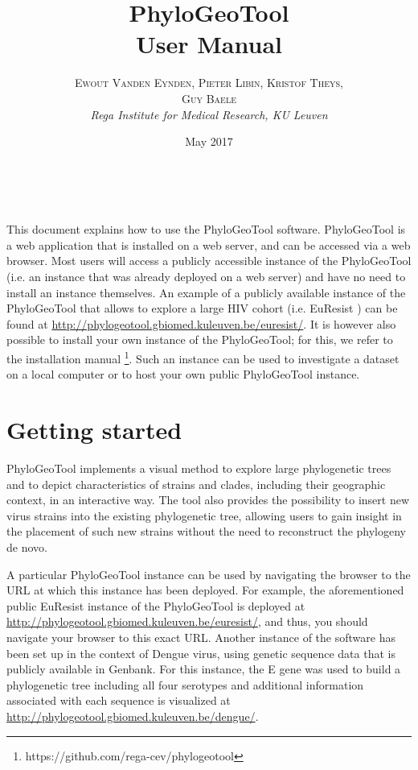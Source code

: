 \documentclass[a4paper, 11pt]{article} %
\title{\textbf{PhyloGeoTool}\\ %
User Manual} %
\author{\textsc{Ewout Vanden Eynden, Pieter Libin, Kristof Theys, \\{Guy Baele}} %
\\{\textit{Rega Institute for Medical Research, KU Leuven}}} %
\date{May 2017} %
\makeatletter
\renewcommand{\maketitle}{ %
\begin{flushright} %
{\LARGE\@title} %

\vspace{50pt} %

{\large\@author} %
\\\@date %

\vspace{40pt} %
\end{flushright}
}
\makeatother
\begin{document}
\maketitle %


\vspace{30pt} %

\tableofcontents
\newpage

This document explains how to use the PhyloGeoTool software. 
PhyloGeoTool is a web application that is installed on a web server, and can be accessed via a web browser. 
Most users will access a publicly accessible instance of the PhyloGeoTool (i.e. an instance that was already deployed on a web server) and have no need to install an instance themselves. 
An example of a publicly available instance of the PhyloGeoTool that allows to explore a large HIV cohort (i.e. EuResist \cite{Zazzi2012}) can be found at \url{http://phylogeotool.gbiomed.kuleuven.be/euresist/}.
It is however also possible to install your own instance of the PhyloGeoTool; for this, we refer to the installation manual \footnote{https://github.com/rega-cev/phylogeotool}. 
Such an instance can be used to investigate a dataset on a local computer or to host your own public PhyloGeoTool instance.


\section{Getting started}

PhyloGeoTool implements a visual method to explore large phylogenetic trees and to depict characteristics of strains and clades, including their geographic context, in an interactive way.
The tool also provides the possibility to insert new virus strains into the existing phylogenetic tree, allowing users to gain insight in the placement of such new strains without the need to reconstruct the phylogeny de novo.

A particular PhyloGeoTool instance can be used by navigating the browser to the URL at which this instance has been deployed. 
For example, the aforementioned public EuResist instance of the PhyloGeoTool is deployed at \url{http://phylogeotool.gbiomed.kuleuven.be/euresist/}, and thus, you should navigate your browser to this exact URL. 
Another instance of the software has been set up in the context of Dengue virus, using genetic sequence data that is publicly available in Genbank. 
For this instance, the E gene was used to build a phylogenetic tree including all four serotypes and additional information associated with each sequence is visualized at \url{http://phylogeotool.gbiomed.kuleuven.be/dengue/}.  
\end{document}
